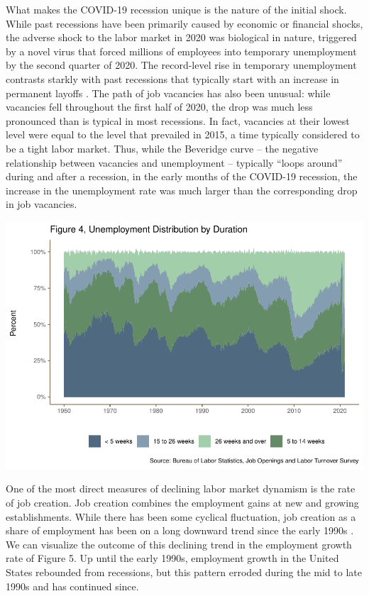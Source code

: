 \documentclass[
  11pt,
]{article}
\begin{document}
What makes the COVID-19 recession unique is the nature of the initial
shock. While past recessions have been primarily caused by economic or
financial shocks, the adverse shock to the labor market in 2020 was
biological in nature, triggered by a novel virus that forced millions of
employees into temporary unemployment by the second quarter of 2020. The
record-level rise in temporary unemployment contrasts starkly with past
recessions that typically start with an increase in permanent layoffs
\citep{elsby10}. The path of job vacancies has also been unusual: while
vacancies fell throughout the first half of 2020, the drop was much less
pronounced than is typical in most recessions. In fact, vacancies at
their lowest level were equal to the level that prevailed in 2015, a
time typically considered to be a tight labor market. Thus, while the
Beveridge curve -- the negative relationship between vacancies and
unemployment -- typically ``loops around'' during and after a recession,
in the early months of the COVID-19 recession, the increase in the
unemployment rate was much larger than the corresponding drop in job
vacancies.

\begin{center}\includegraphics{JOLTS_files/figure-latex/unnamed-chunk-8-1} \end{center}

One of the most direct measures of declining labor market dynamism is
the rate of job creation. Job creation combines the employment gains at
new and growing establishments. While there has been some cyclical
fluctuation, job creation as a share of employment has been on a long
downward trend since the early 1990s \citep{davis14}. We can visualize
the outcome of this declining trend in the employment growth rate of
Figure 5. Up until the early 1990s, employment growth in the United
States rebounded from recessions, but this pattern erroded during the
mid to late 1990s and has continued since.
\end{document}
